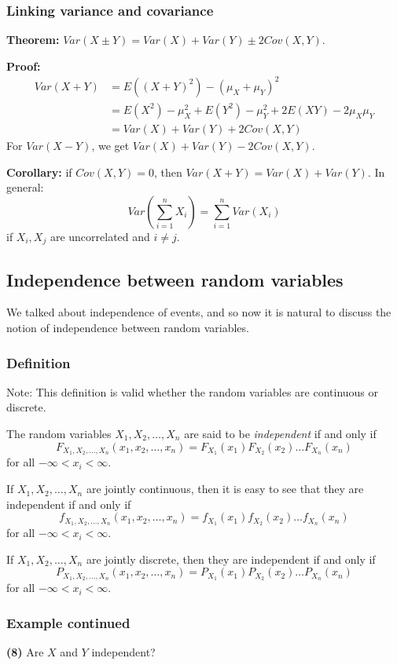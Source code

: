 \documentclass[12pt]{article}
\begin{document}
\subsubsection{Linking variance and covariance}
\textbf{Theorem:} $Var(X \pm Y) = Var(X) + Var(Y) \pm 2 Cov(X,Y)$.

\textbf{Proof:}
\begin{align*}
    Var(X + Y) &= E((X+Y)^2) - (\mu_X + \mu_Y)^2 \\
        &= E(X^2) - \mu_X^2 + E(Y^2) - \mu_Y^2 + 2 E(XY) - 2 \mu_X \mu_Y \\
        &= Var(X) + Var(Y) + 2 Cov(X,Y)
\end{align*}
For $Var(X - Y)$, we get $Var(X) + Var(Y) - 2 Cov(X,Y)$.

\textbf{Corollary:} if $Cov(X,Y) = 0$, then $Var(X+Y) = Var(X) + Var(Y)$. In general:
\[
    Var(\sum_{i=1}^n X_i) = \sum_{i=1}^n Var(X_i)
\]
if $X_i, X_j$ are uncorrelated and $i \neq j$.

\subsection{Independence between random variables}
We talked about independence of events, and so now it is natural to discuss the notion of independence between random variables. 

\subsubsection{Definition}
Note: This definition is valid whether the random variables are continuous or discrete.

The random variables $X_1, X_2, \dots, X_n$ are said to be \emph{independent} if and only if
\[
    F_{X_1, X_2, \dots, X_n} (x_1, x_2, \dots, x_n) = F_{X_1} (x_1) F_{X_2} (x_2) \dots F_{X_n} (x_n)
\]
for all $-\infty < x_i < \infty$.

If $X_1, X_2, \dots, X_n$ are jointly continuous, then it is easy to see that they are independent if and only if
\[
    f_{X_1, X_2, \dots, X_n} (x_1, x_2, \dots, x_n) = f_{X_1} (x_1) f_{X_2} (x_2) \dots f_{X_n} (x_n)
\]
for all $-\infty < x_i < \infty$.

If $X_1, X_2, \dots, X_n$ are jointly discrete, then they are independent if and only if
\[
    P_{X_1, X_2, \dots, X_n} (x_1, x_2, \dots, x_n) = P_{X_1} (x_1) P_{X_2} (x_2) \dots P_{X_n} (x_n)
\]
for all $-\infty < x_i < \infty$.

\subsubsection{Example continued}
\textbf{(8)} Are $X$ and $Y$ independent?
\end{document}
